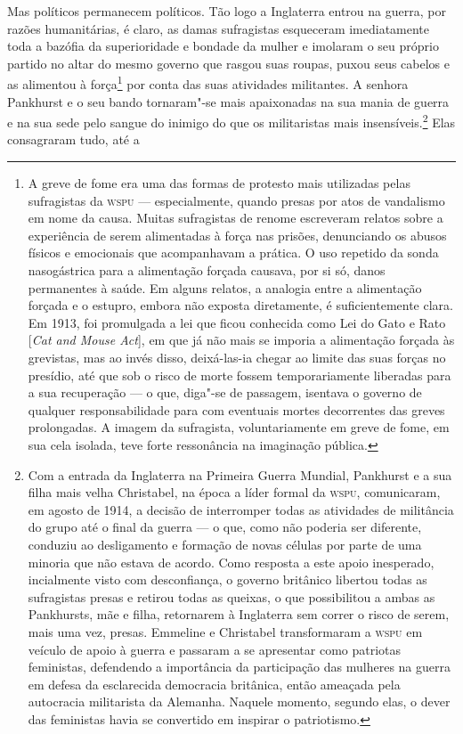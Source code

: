 Mas políticos permanecem políticos. Tão logo a Inglaterra entrou na
guerra, por razões humanitárias, é claro, as damas sufragistas
esqueceram imediatamente toda a bazófia da superioridade e bondade da
mulher e imolaram o seu próprio partido no altar do mesmo governo que
rasgou suas roupas, puxou seus cabelos e as alimentou à força\footnote{A
  greve de fome era uma das formas de protesto mais utilizadas pelas
  sufragistas da \textsc{wspu} --- especialmente, quando presas por atos de vandalismo
  em nome da causa. Muitas
  sufragistas de renome escreveram relatos sobre a experiência de serem
  alimentadas à força nas prisões, denunciando os abusos físicos e
  emocionais que acompanhavam a prática. O uso repetido da sonda
  nasogástrica para a alimentação forçada causava, por si só, danos
  permanentes à saúde. Em alguns relatos, a analogia entre a alimentação
  forçada e o estupro, embora não exposta diretamente, é suficientemente
  clara. Em 1913, foi promulgada a lei que ficou conhecida como Lei do
  Gato e Rato {[}\emph{Cat and Mouse Act}{]}, em que já não mais se
  imporia a alimentação forçada às grevistas, mas ao invés disso,
  deixá-las-ia chegar ao limite das suas forças no presídio, até que sob o
  risco de morte fossem temporariamente liberadas para a sua
  recuperação --- o que, diga"-se de passagem, isentava o governo de
  qualquer responsabilidade para com eventuais mortes decorrentes das
  greves prolongadas. A imagem da sufragista, voluntariamente em greve
  de fome, em sua cela isolada, teve forte ressonância na imaginação
  pública.} por conta das suas atividades militantes. A senhora
Pankhurst e o seu bando tornaram"-se mais apaixonadas na sua mania de
guerra e na sua sede pelo sangue do inimigo do que os militaristas mais
insensíveis.\footnote{Com a entrada da Inglaterra na Primeira Guerra
  Mundial, Pankhurst e a sua filha mais velha Christabel, na época a
  líder formal da \textsc{wspu}, comunicaram, em agosto de 1914, a decisão de
  interromper todas as atividades de militância do grupo até o final da
  guerra --- o que, como não poderia ser diferente, conduziu ao
  desligamento e formação de novas células por parte de uma minoria que
  não estava de acordo. Como resposta a este apoio inesperado,
  incialmente visto com desconfiança, o governo britânico libertou todas
  as sufragistas presas e retirou todas as queixas, o que possibilitou a
  ambas as Pankhursts, mãe e filha, retornarem à Inglaterra sem correr o
  risco de serem, mais uma vez, presas. Emmeline e Christabel
  transformaram a \textsc{wspu} em veículo de apoio à guerra e passaram a se
  apresentar como patriotas feministas, defendendo a importância da
  participação das mulheres na guerra em defesa da esclarecida
  democracia britânica, então ameaçada pela autocracia militarista da
  Alemanha. Naquele momento, segundo elas, o dever das feministas havia
  se convertido em inspirar o patriotismo.} Elas consagraram tudo, até a
